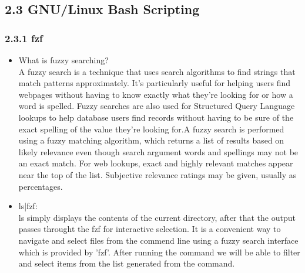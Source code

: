 \documentclass{article}
\begin{document}
\subsection*{\Large 2.3 GNU/Linux Bash Scripting}
\subsubsection*{\large 2.3.1 fzf}
\begin{itemize}
    \item What is fuzzy searching?\\
    A fuzzy search is a technique that uses search algorithms to find strings that match patterns approximately. It's particularly useful for helping users find webpages without having to know exactly what they're looking for or how a word is spelled. Fuzzy searches are also used for Structured Query Language lookups to help database users find records without having to be sure of the exact spelling of the value they're looking for.A fuzzy search is performed using a fuzzy matching algorithm, which returns a list of results based on likely relevance even though search argument words and spellings may not be an exact match. For web lookups, exact and highly relevant matches appear near the top of the list. Subjective relevance ratings may be given, usually as percentages.
    \item ls|fzf:\\
    ls simply displays the contents of the current directory, after that the output passes throught the 
    fzf  for interactive selection. It is a convenient way to navigate and select files from the commend line
    using a fuzzy search interface which is provided by 'fzf'. After running the command we will be able to filter 
    and select items from the list generated from the  command.
\end{itemize}
\end{document}
